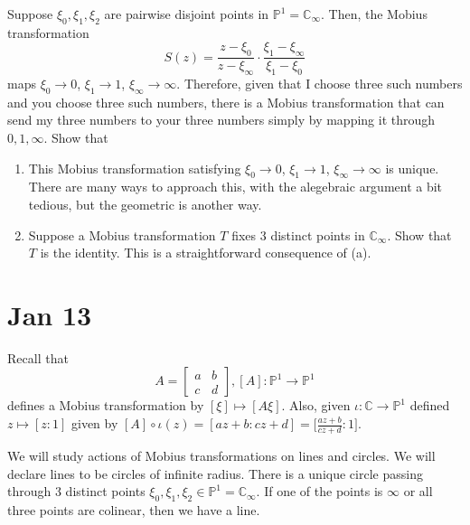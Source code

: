   \begin{exercise}
    Suppose $\xi_0, \xi_1, \xi_2$ are pairwise disjoint points in $\mathbb{P}^1 = \mathbb{C}_\infty$. Then, the Mobius transformation 
    \begin{equation}
      S(z) = \frac{z - \xi_0}{z - \xi_\infty} \cdot \frac{\xi_1 - \xi_\infty}{\xi_1 - \xi_0}
    \end{equation}
    maps $\xi_0 \to 0$, $\xi_1 \to 1$, $\xi_\infty \to \infty$. Therefore, given that I choose three such numbers and you choose three such numbers, there is a Mobius transformation that can send my three numbers to your three numbers simply by mapping it through $0, 1, \infty$. Show that 
    \begin{enumerate}
      \item This Mobius transformation satisfying $\xi_0 \to 0$, $\xi_1 \to 1$, $\xi_\infty \to \infty$ is unique. There are many ways to approach this, with the alegebraic argument a bit tedious, but the geometric is another way. 
      \item Suppose a Mobius transformation $T$ fixes 3 distinct points in $\mathbb{C}_\infty$. Show that $T$ is the identity. This is a straightforward consequence of (a). 
    \end{enumerate}
  \end{exercise}

\section{Jan 13} 

  Recall that 
  \begin{equation}
    A = \begin{bmatrix} a & b \\ c & d \end{bmatrix}, [A]: \mathbb{P}^1 \to \mathbb{P}^1 
  \end{equation}
  defines a Mobius transformation by $[\xi] \mapsto [A \xi]$. Also, given $\iota: \mathbb{C} \to \mathbb{P}^1$ defined $z \mapsto [z : 1]$ given by $[A] \circ \iota (z) = [az + b : cz + d] = \big[ \frac{az + b}{cz + d} : 1 \big]$. 

  We will study actions of Mobius transformations on lines and circles. We will declare lines to be circles of infinite radius. There is a unique circle passing through 3 distinct points $\xi_0, \xi_1, \xi_2 \in \mathbb{P}^1 = \mathbb{C}_{\infty}$. If one of the points is $\infty$ or all three points are colinear, then we have a line. 

